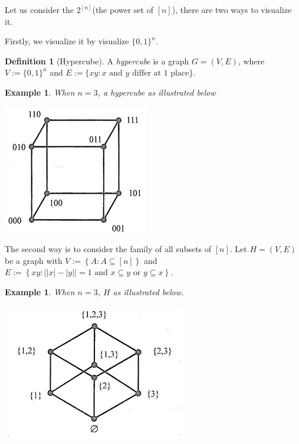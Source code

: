 \documentclass{article}
\newtheorem{example}[theorem]{Example}
\theoremstyle{definition}
\newtheorem{definition}[theorem]{Definition}
\begin{document}
Let us consider the $2^{[n]}$(the power set of $[n]$), there are two ways to visualize it.

Firstly, we visualize it by visualize $\{0,1\}^n$.

\begin{definition}[Hypercube]
     A \emph{hypercube} is a graph $G=(V,E)$, where $V:=\{0,1\}^n$ and $E:=\{xy:x \text{ and } y \text{ differ at 1 place} \}$.
\end{definition}

\begin{example}
    When $n=3$, a hypercube as illustrated below
    \begin{center}
            \includegraphics[scale=0.9]{2-1.jpg}
    \end{center}
\end{example}

The second way is to consider the family of all subsets of $[n]$. Let $H=(V,E)$ be a graph with $V:=\left \{ A : A\subseteq[n] \right \} $ and $E:=\left \{ xy : \left | \left | x \right | -\left | y \right |  \right |=1 \text{ and }
x\subseteq y \text{ or } y \subseteq x\right \} $.

\begin{example}
    When $n=3$, $H$ as illustrated below.
    \begin{center}
            \includegraphics[scale=0.9]{2-2.jpg}
    \end{center}
\end{example}
\end{document}
